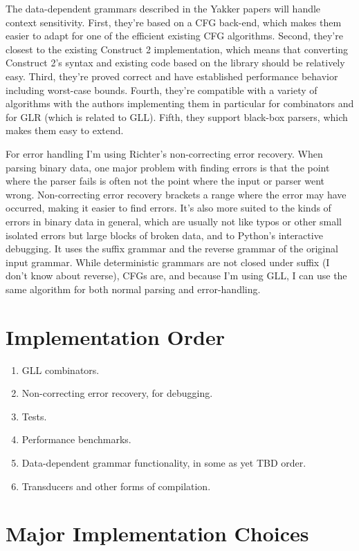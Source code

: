\documentclass[12pt]{article}
\begin{document}
The data-dependent grammars described in the Yakker papers will handle
context sensitivity.  First, they're based on a CFG back-end, which
makes them easier to adapt for one of the efficient existing CFG
algorithms.  Second, they're closest to the existing Construct 2
implementation, which means that converting Construct 2's syntax and
existing code based on the library should be relatively easy.  Third,
they're proved correct and have established performance behavior
including worst-case bounds.  Fourth, they're compatible with a variety
of algorithms with the authors implementing them in particular for
combinators and for GLR (which is related to GLL).  Fifth, they
support black-box parsers, which makes them easy to extend.

For error handling I'm using Richter's non-correcting error recovery.
When parsing binary data, one major problem with finding errors is
that the point where the parser fails is often not the point where the
input or parser went wrong.  Non-correcting error recovery brackets a
range where the error may have occurred, making it easier to find
errors.  It's also more suited to the kinds of errors in binary data
in general, which are usually not like typos or other small isolated
errors but large blocks of broken data, and to Python's interactive
debugging.  It uses the suffix grammar and the reverse grammar of the
original input grammar.  While deterministic grammars are not closed
under suffix (I don't know about reverse), CFGs are, and because I'm
using GLL, I can use the same algorithm for both normal parsing and
error-handling.


\section{Implementation Order}
\label{sec:implementation_order}

\begin{enumerate}
\item GLL combinators.
\item Non-correcting error recovery, for debugging.
\item Tests.
\item Performance benchmarks.
\item Data-dependent grammar functionality, in some as yet TBD order.
\item Transducers and other forms of compilation.
\end{enumerate}


\section{Major Implementation Choices}
\label{sec:implementation_choices}
\end{document}
